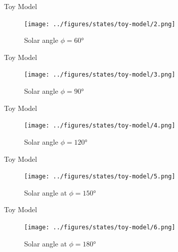 \documentclass[10pt, xcolor={dvipsnames}]{beamer}
\begin{document}
\begin{frame}{Toy Model}
\begin{center}
\begin{figure}
\texttt{[image: ../figures/states/toy-model/2.png]}
\caption{Solar angle $\phi = 60$°}
\end{figure}
\end{center}
\end{frame}

\begin{frame}{Toy Model}
\begin{center}
\begin{figure}
\texttt{[image: ../figures/states/toy-model/3.png]}
\caption{Solar angle $\phi = 90$°}
\end{figure}
\end{center}
\end{frame}

\begin{frame}{Toy Model}
\begin{center}
\begin{figure}
\texttt{[image: ../figures/states/toy-model/4.png]}
\caption{Solar angle $\phi = 120$°}
\end{figure}
\end{center}
\end{frame}

\begin{frame}{Toy Model}
\begin{center}
\begin{figure}
\texttt{[image: ../figures/states/toy-model/5.png]}
\caption{Solar angle at $\phi = 150$°}
\end{figure}
\end{center}
\end{frame}

\begin{frame}{Toy Model}
\begin{center}
\begin{figure}
\texttt{[image: ../figures/states/toy-model/6.png]}
\caption{Solar angle at $\phi = 180$°}
\end{figure}
\end{center}
\end{frame}
\end{document}
